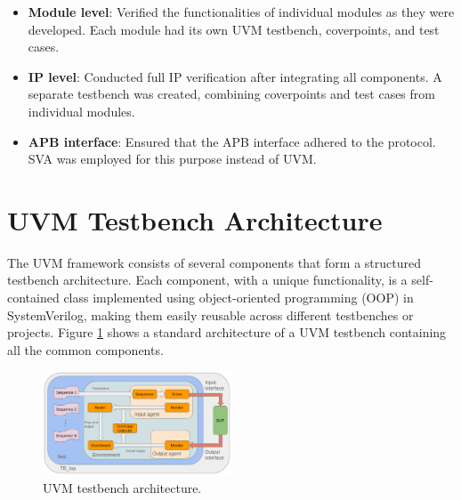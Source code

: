 \documentclass[conference]{IEEEtran}
\begin{document}
\begin{itemize}
    \item \textbf{Module level}: Verified the functionalities of individual modules as they were developed. Each module had its own UVM testbench, coverpoints, and test cases.
    \item \textbf{IP level}: Conducted full IP verification after integrating all components. A separate testbench was created, combining coverpoints and test cases from individual modules.
    \item \textbf{APB interface}: Ensured that the APB interface adhered to the protocol. SVA was employed for this purpose instead of UVM.
\end{itemize}

\section{UVM Testbench Architecture}

The UVM framework consists of several components that form a structured testbench architecture. Each component, with a unique functionality, is a self-contained class implemented using object-oriented programming (OOP) in SystemVerilog, making them easily reusable across different testbenches or projects. Figure \ref{fig:uvm} shows a standard architecture of a UVM testbench containing all the common components.


\begin{figure}[h!]
    \centering
    \includegraphics[width = 0.5\textwidth]{figures/uvm.png}
    \caption{UVM testbench architecture.}
    \label{fig:uvm}
\end{figure}
\end{document}
